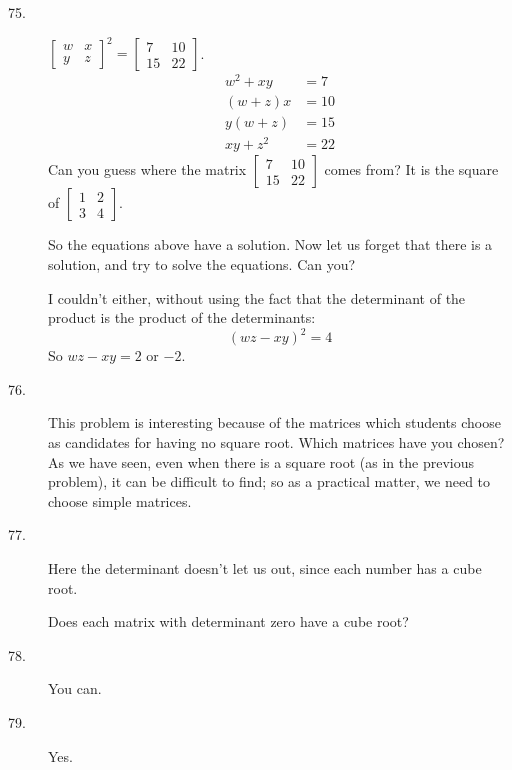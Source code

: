 \documentclass{article}
\begin{document}
\begin{description}
  \item[75.] $\begin{bmatrix} w & x \\ y & z \end{bmatrix}^2  =  \begin{bmatrix} 7 & 10 \\ 15 & 22 \end{bmatrix}$.
    \begin{align*} 
    w^2 + xy & =  7 \\
     (w+z) x & = 10 \\ 
     y (w+z) & = 15 \\
    xy + z^2 & = 22
    \end{align*}
    Can you guess where the matrix $\begin{bmatrix} 7 & 10 \\ 15 & 22 \end{bmatrix}$ comes from? It is the square of $\begin{bmatrix} 1 & 2 \\ 3 & 4 \end{bmatrix}$.

    So the equations above have a solution. Now let us forget that there is a solution, and try to solve the equations. Can you?

    I couldn't either, without using the fact that the determinant of the product is the product of the determinants:
    \begin{equation*}
    (wz - xy)^2 = 4
    \end{equation*}
    So $wz - xy = 2$ or $-2$.

  \item[76.] This problem is interesting because of the matrices which students choose as candidates for having no square root. Which matrices have you chosen? As we have seen, even when there is a square root (as in the previous problem), it can be difficult to find; so as a practical matter, we need to choose simple matrices.

  \item[77.] Here the determinant doesn't let us out, since each number has a cube root. 

    Does each matrix with determinant zero have a cube root?

  \item[78.] You can.

  \item[79.] Yes.

\end{description}
\end{document}
